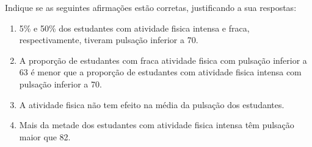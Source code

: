 \documentclass[
]{latex/krantz}
\providecommand{\tightlist}{%
  \setlength{\itemsep}{0pt}\setlength{\parskip}{0pt}}
\theoremstyle{definition}
\theoremstyle{definition}
\theoremstyle{definition}
\theoremstyle{definition}
\theoremstyle{remark}
\begin{document}
Indique se as seguintes afirmações estão corretas, justificando a sua respostas:

\begin{enumerate}
\def\labelenumi{\alph{enumi})}
\tightlist
\item
  5\% e 50\% dos estudantes com atividade fisica intensa e fraca, respectivamente, tiveram pulsação inferior a 70.
\item
  A proporção de estudantes com fraca atividade fisica com pulsação inferior a 63 é menor que a proporção de estudantes com atividade fisica intensa com pulsação inferior a 70.
\item
  A atividade fisica não tem efeito na média da pulsação dos estudantes.
\item
  Mais da metade dos estudantes com atividade fisica intensa têm pulsação maior que 82.
\end{enumerate}
\end{document}

